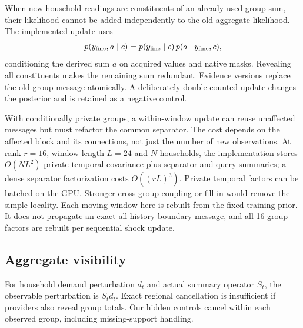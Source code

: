 \documentclass[conference]{IEEEtran}
\begin{document}
When new household readings are constituents of an already used group sum, their likelihood cannot be added independently to the old aggregate likelihood. The implemented update uses
\begin{equation}
p(y_{\rm fine},a\mid c)
=p(y_{\rm fine}\mid c)\,p(a\mid y_{\rm fine},c),\label{eq:replace}
\end{equation}
conditioning the derived sum $a$ on acquired values and native masks. Revealing all constituents makes the remaining sum redundant. Evidence versions replace the old group message atomically. A deliberately double-counted update changes the posterior and is retained as a negative control.

With conditionally private groups, a within-window update can reuse unaffected messages but must refactor the common separator. The cost depends on the affected block and its connections, not just the number of new observations. At rank $r=16$, window length $L=24$ and $N$ households, the implementation stores $O(NL^2)$ private temporal covariance plus separator and query summaries; a dense separator factorization costs $O((rL)^3)$. Private temporal factors can be batched on the GPU. Stronger cross-group coupling or fill-in would remove the simple locality. Each moving window here is rebuilt from the fixed training prior. It does not propagate an exact all-history boundary message, and all 16 group factors are rebuilt per sequential shock update.

\subsection{Aggregate visibility}
For household demand perturbation $d_t$ and actual summary operator $S_t$, the observable perturbation is $S_t d_t$. Exact regional cancellation is insufficient if providers also reveal group totals. Our hidden controls cancel within each observed group, including missing-support handling.
\end{document}
